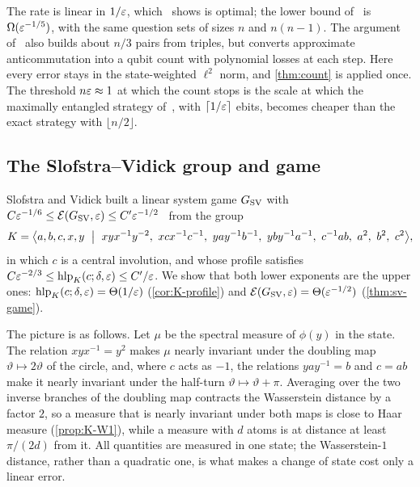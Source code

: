 \begin{remark}\label{rates:rem-chsh}
The rate is linear in $1/\varepsilon$, which~\cite[Theorem~2]{OV18} shows is optimal; the lower bound of~\cite[Theorem~1]{OV18} is
$\Omega(\varepsilon^{-1/5})$, with the same question sets of sizes $n$ and $n(n-1)$. The argument of~\cite{OV18} also builds about $n/3$ pairs from
triples, but converts approximate anticommutation into a qubit count with polynomial losses at each step. Here every error stays in the
state-weighted $\ell^2$ norm, and \cref{thm:count} is applied once. The threshold $n\varepsilon\approx1$ at which the count stops is the scale at
which the maximally entangled strategy of~\cite[Theorem~2]{OV18}, with $\lceil1/\varepsilon\rceil$ ebits, becomes cheaper than the exact strategy
with $\lfloor n/2\rfloor$.
\end{remark}

\subsection{The Slofstra--Vidick group and game}\label{sec:rates-sv}

Slofstra and Vidick built a linear system game $G_{\mathrm{SV}}$ with $C\varepsilon^{-1/6}\le\mathcal E(G_{\mathrm{SV}},\varepsilon)\le C'\varepsilon^{-1/2}$~\cite[Theorem~1.1]{SV18} from
the group~\cite[Proposition~3.2]{SV18}
\begin{equation}\label{eq:K}
K=\bigl\langle a,b,c,x,y\ \bigm|\ xyx^{-1}y^{-2},\ xcx^{-1}c^{-1},\ yay^{-1}b^{-1},\ yby^{-1}a^{-1},\ c^{-1}ab,\ a^2,\ b^2,\ c^2\bigr\rangle,
\end{equation}
in which $c$ is a central involution, and whose profile satisfies $C\varepsilon^{-2/3}\le\operatorname{hlp}_K(c;\delta,\varepsilon)\le C'/\varepsilon$. We show that both
lower exponents are the upper ones: $\operatorname{hlp}_K(c;\delta,\varepsilon)=\Theta(1/\varepsilon)$ (\cref{cor:K-profile}) and $\mathcal E(G_{\mathrm{SV}},\varepsilon)=\Theta(\varepsilon^{-1/2})$
(\cref{thm:sv-game}).

The picture is as follows. Let $\mu$ be the spectral measure of $\phi(y)$ in the state. The relation $xyx^{-1}=y^2$ makes $\mu$ nearly
invariant under the doubling map $\vartheta\mapsto2\vartheta$ of the circle, and, where $c$ acts as $-1$, the relations $yay^{-1}=b$ and
$c=ab$ make it nearly invariant under the half-turn $\vartheta\mapsto\vartheta+\pi$. Averaging over the two inverse branches of the
doubling map contracts the Wasserstein distance by a factor $2$, so a measure that is nearly invariant under both maps is close to Haar
measure (\cref{prop:K-W1}), while a measure with $d$ atoms is at distance at least $\pi/(2d)$ from it. All quantities are measured in
one state; the
Wasserstein-$1$ distance, rather than a quadratic one, is what makes a change of state cost only a linear error.

